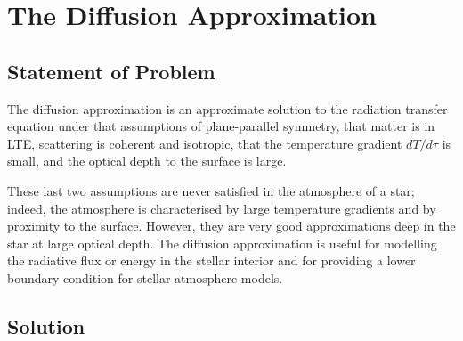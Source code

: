 \newslide

\section{The Diffusion Approximation}
\label{section:diffusion-approximation}

\subsection{Statement of Problem}

The diffusion approximation is an approximate solution to
the radiation transfer equation under that assumptions of plane-parallel symmetry, that matter is
in LTE, scattering is coherent and isotropic, that 
the temperature gradient $dT/d\tau$ is small, and the optical depth to the surface is large.

These last two assumptions are never satisfied in the atmosphere of a
star; indeed, the atmosphere is characterised by large
temperature gradients and by proximity to the surface. 
However, they
are very good approximations deep in the star at large
optical depth. The diffusion approximation is useful for
modelling the radiative flux or energy in the stellar interior and for
providing a lower boundary condition for stellar atmosphere
models.

\newslide

\subsection{Solution}

